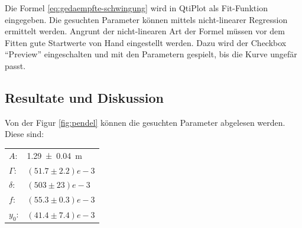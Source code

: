Die Formel \ref{eq:gedaempfte-schwingung} wird in QtiPlot als Fit-Funktion eingegeben. Die gesuchten
Parameter k\"onnen mittels nicht-linearer Regression ermittelt werden. Angrunt der nicht-linearen Art
der Formel m\"ussen vor dem Fitten gute Startwerte von Hand eingestellt werden. Dazu wird der Checkbox
``Preview'' eingeschalten und mit den Parametern gespielt, bis die Kurve ungef\"ar passt.


\subsection{Resultate und Diskussion}

Von der Figur \ref{fig:pendel} k\"onnen die gesuchten Parameter abgelesen werden. Diese sind:
\begin{tabular}{ll}
    $A$:        &  \SI{1.29 \pm 0.04}{m}    \\
    $\Gamma$:   &  $(51.7 \pm 2.2) e-3$ \\
    $\delta$:   &  $(503  \pm 23) e-3$  \\
    $f$:        &  $(55.3 \pm 0.3) e-3$ \\
    $y_0$:      &  $(41.4 \pm 7.4) e-3$ \\
\end{tabular}

